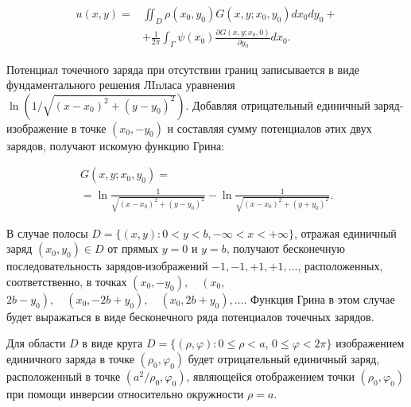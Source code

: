 \documentclass[10pt]{article}
\begin{document}
\[

\begin{aligned}

u(x, y)= & \iint_{D} \rho\left(x_{0}, y_{0}\right) G\left(x, y ; x_{0}, y_{0}\right) d x_{0} d y_{0}+ \\

& +\frac{1}{2 \pi} \int_{\Gamma} \psi\left(x_{0}\right) \frac{\partial G\left(x, y ; x_{0}, 0\right)}{\partial y_{0}} d x_{0} .

\end{aligned}

\]



Потенциал точечного заряда при отсутствии границ записывается в виде фундаментального решения ЛInласа уравнения $\ln \left(1 / \sqrt{\left(x-x_{0}\right)^{2}+\left(y-y_{0}\right)^{2}}\right)$. Добавляя отрицательный единичный заряд-изображение в точке $\left(x_{0},-y_{0}\right)$ и составляя сумму потенциалов әтих двух зарядов, получают искомую функцию Грина:



\[

\begin{gathered}

G\left(x, y ; x_{0}, y_{0}\right)= \\

=\ln \frac{1}{\sqrt{\left(x-x_{0}\right)^{2}+\left(y-y_{0}\right)^{2}}}-\ln \frac{1}{\sqrt{\left(x-x_{0}\right)^{2}+\left(y+y_{0}\right)^{2}}} .

\end{gathered}

\]



В случае полосы $D=\{(x, y): 0<y<b,-\infty<x<+\infty\}$, отражая единичный заряд $\left(x_{0}, y_{0}\right) \in D$ от прямых $y=0$ и $y=b$, получают бесконечную последовательность зарядов-изображений $-1,-1,+1,+1, \ldots$, расположенных, соответственно, в точках $\left(x_{0},-y_{0}\right), \quad\left(x_{0}\right.$, $\left.2 b-y_{0}\right), \quad\left(x_{0},-2 b+y_{0}\right), \quad\left(x_{0}, 2 b+y_{0}\right), \ldots$. Функция Грина в этом случае будет выражаться в виде бесконечного ряда потенциалов точечных зарядов.



Для области $D$ в виде круга $D=\{(\rho, \varphi): 0 \leqslant \rho<a$, $0 \leqslant \varphi<2 \pi\}$ изображением единичного заряда в точке $\left(\rho_{0}, \varphi_{0}\right)$ будет отрицательный единичный заряд, расположенный в точке $\left(a^{2} / \rho_{0}, \varphi_{0}\right)$, являющейся отображением точки $\left(\rho_{0}, \varphi_{0}\right)$ при помощи инверсии относительно окружности $\rho=a$.
\end{document}
